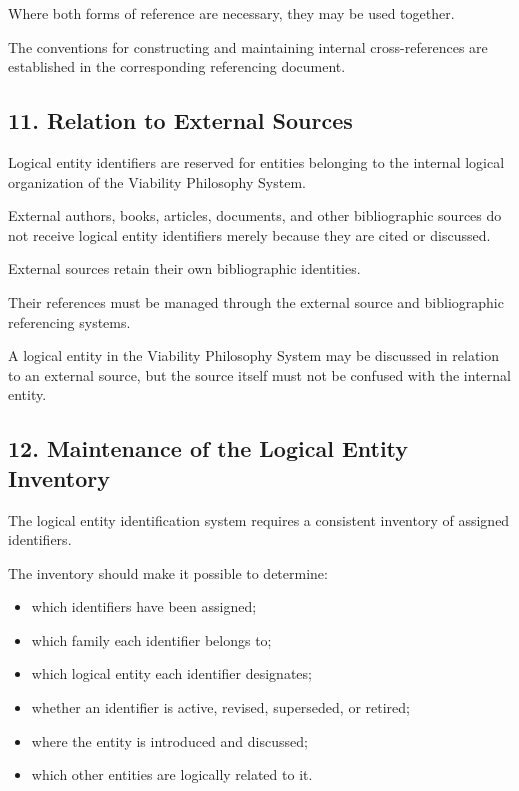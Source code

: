 Where both forms of reference
are necessary, they may be used
together.

The conventions for constructing
and maintaining internal
cross-references are established
in the corresponding referencing
document.


\subsection*{11. Relation to External Sources}

Logical entity identifiers are
reserved for entities belonging
to the internal logical organization
of the Viability Philosophy System.

External authors, books, articles,
documents, and other bibliographic
sources do not receive logical
entity identifiers merely because
they are cited or discussed.

External sources retain their
own bibliographic identities.

Their references must be managed
through the external source and
bibliographic referencing systems.

A logical entity in the Viability
Philosophy System may be discussed
in relation to an external source,
but the source itself must not
be confused with the internal
entity.


\subsection*{12. Maintenance of the Logical
Entity Inventory}

The logical entity identification
system requires a consistent
inventory of assigned identifiers.

The inventory should make it
possible to determine:

\begin{itemize}
    \item which identifiers have
    been assigned;
    \item which family each identifier
    belongs to;
    \item which logical entity
    each identifier designates;
    \item whether an identifier
    is active, revised, superseded,
    or retired;
    \item where the entity is
    introduced and discussed;
    \item which other entities
    are logically related to it.
\end{itemize}

